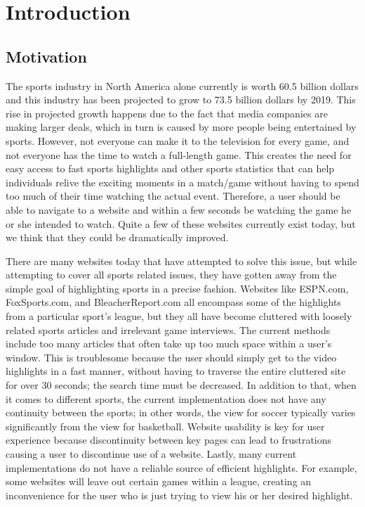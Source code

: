 \chapter{Introduction}

\section{Motivation}
\par The sports industry in North America alone currently is worth 60.5 billion dollars and this industry has been projected to grow to 73.5 billion dollars by 2019. This rise in projected growth happens due to the fact that media companies are making larger deals, which in turn is caused by more people being entertained by sports. However, not everyone can make it to the television for every game, and not everyone has the time to watch a full-length game. This creates the need for easy access to fast sports highlights and other sports statistics that can help individuals relive the exciting moments in a match/game without having to spend too much of their time watching the actual event. Therefore, a user should be able to navigate to a website and within a few seconds be watching the game he or she intended to watch. Quite a few of these websites currently exist today, but we think that they could be dramatically improved.
\par There are many websites today that have attempted to solve this issue, but while attempting to cover all sports related issues, they have gotten away from the simple goal of highlighting sports in a precise fashion. Websites like ESPN.com, FoxSports.com, and BleacherReport.com all encompass some of the highlights from a particular sport’s league, but they all have become cluttered with loosely related sports articles and irrelevant game interviews. The current methods include too many articles that often take up too much space within a user’s window. This is troublesome because the user should simply get to the video highlights in a fast manner, without having to traverse the entire cluttered site for over 30 seconds; the search time must be decreased. In addition to that, when it comes to different sports, the current implementation does not have any continuity between the sports; in other words, the view for soccer typically varies significantly from the view for basketball. Website usability is key for user experience because discontinuity between key pages can lead to frustrations causing a user to discontinue use of a website. Lastly, many current implementations do not have a reliable source of efficient highlights. For example, some websites will leave out certain games within a league, creating an inconvenience for the user who is just trying to view his or her desired highlight.

